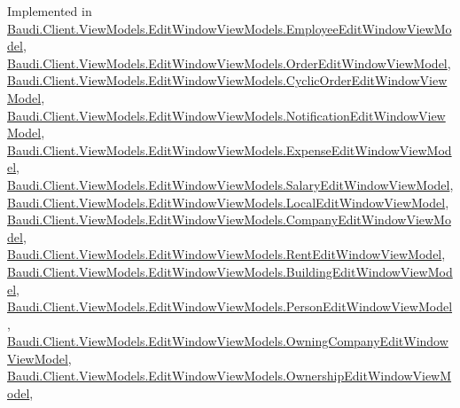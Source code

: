 Implemented in \hyperlink{class_baudi_1_1_client_1_1_view_models_1_1_edit_window_view_models_1_1_employee_edit_window_view_model_afadd6c5b30e7601cdc3b151637d6b16a}{Baudi.\+Client.\+View\+Models.\+Edit\+Window\+View\+Models.\+Employee\+Edit\+Window\+View\+Model}, \hyperlink{class_baudi_1_1_client_1_1_view_models_1_1_edit_window_view_models_1_1_order_edit_window_view_model_a52ab30c89b4cb925219a204a115f7acc}{Baudi.\+Client.\+View\+Models.\+Edit\+Window\+View\+Models.\+Order\+Edit\+Window\+View\+Model}, \hyperlink{class_baudi_1_1_client_1_1_view_models_1_1_edit_window_view_models_1_1_cyclic_order_edit_window_view_model_af7cf51f90a4fc518df4ecea131138d8d}{Baudi.\+Client.\+View\+Models.\+Edit\+Window\+View\+Models.\+Cyclic\+Order\+Edit\+Window\+View\+Model}, \hyperlink{class_baudi_1_1_client_1_1_view_models_1_1_edit_window_view_models_1_1_notification_edit_window_view_model_ade7361440d2171e32dcfb52ac8b1520b}{Baudi.\+Client.\+View\+Models.\+Edit\+Window\+View\+Models.\+Notification\+Edit\+Window\+View\+Model}, \hyperlink{class_baudi_1_1_client_1_1_view_models_1_1_edit_window_view_models_1_1_expense_edit_window_view_model_ac0a047fbff4a391af6c2c56ba47e86fb}{Baudi.\+Client.\+View\+Models.\+Edit\+Window\+View\+Models.\+Expense\+Edit\+Window\+View\+Model}, \hyperlink{class_baudi_1_1_client_1_1_view_models_1_1_edit_window_view_models_1_1_salary_edit_window_view_model_aa474329edaea7b5e57089995cb532c05}{Baudi.\+Client.\+View\+Models.\+Edit\+Window\+View\+Models.\+Salary\+Edit\+Window\+View\+Model}, \hyperlink{class_baudi_1_1_client_1_1_view_models_1_1_edit_window_view_models_1_1_local_edit_window_view_model_a001b42b1f322fa523666d5a7b5ac4dcc}{Baudi.\+Client.\+View\+Models.\+Edit\+Window\+View\+Models.\+Local\+Edit\+Window\+View\+Model}, \hyperlink{class_baudi_1_1_client_1_1_view_models_1_1_edit_window_view_models_1_1_company_edit_window_view_model_ac462d4ac40f92a6ae0672ffa69e2557d}{Baudi.\+Client.\+View\+Models.\+Edit\+Window\+View\+Models.\+Company\+Edit\+Window\+View\+Model}, \hyperlink{class_baudi_1_1_client_1_1_view_models_1_1_edit_window_view_models_1_1_rent_edit_window_view_model_ad2e1189fc38a45cfc458b6bae1af2284}{Baudi.\+Client.\+View\+Models.\+Edit\+Window\+View\+Models.\+Rent\+Edit\+Window\+View\+Model}, \hyperlink{class_baudi_1_1_client_1_1_view_models_1_1_edit_window_view_models_1_1_building_edit_window_view_model_a67e69fe04463495d6fe4992bcdef29c2}{Baudi.\+Client.\+View\+Models.\+Edit\+Window\+View\+Models.\+Building\+Edit\+Window\+View\+Model}, \hyperlink{class_baudi_1_1_client_1_1_view_models_1_1_edit_window_view_models_1_1_person_edit_window_view_model_a2d52c4d871da4de6e7e211a1408489d6}{Baudi.\+Client.\+View\+Models.\+Edit\+Window\+View\+Models.\+Person\+Edit\+Window\+View\+Model}, \hyperlink{class_baudi_1_1_client_1_1_view_models_1_1_edit_window_view_models_1_1_owning_company_edit_window_view_model_ab5adf908e10e9274b2bd3e501189246b}{Baudi.\+Client.\+View\+Models.\+Edit\+Window\+View\+Models.\+Owning\+Company\+Edit\+Window\+View\+Model}, \hyperlink{class_baudi_1_1_client_1_1_view_models_1_1_edit_window_view_models_1_1_ownership_edit_window_view_model_ab2ffa8b3be50a482f14995de97d3f304}{Baudi.\+Client.\+View\+Models.\+Edit\+Window\+View\+Models.\+Ownership\+Edit\+Window\+View\+Model}, 